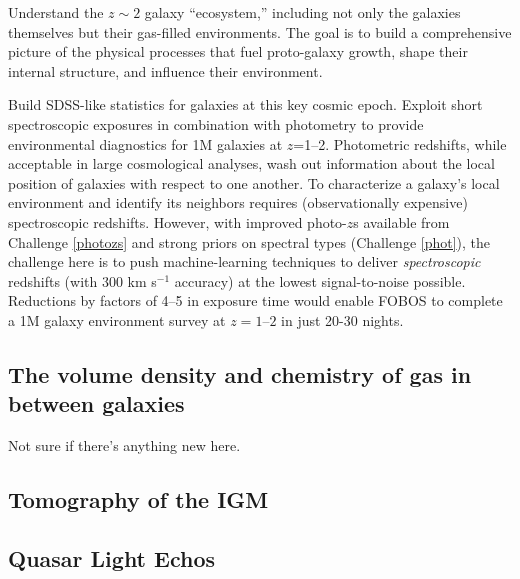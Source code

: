 Understand the $z \sim 2$ galaxy ``ecosystem,'' including not only
the galaxies themselves but their gas-filled environments. The goal
is to build a comprehensive picture of the physical processes that
fuel proto-galaxy growth, shape their internal structure, and
influence their environment.

\noindent{} Build SDSS-like statistics for galaxies at
this key cosmic epoch. Exploit short spectroscopic exposures in
combination with photometry to provide environmental diagnostics for
1M galaxies at $z$=1--2. Photometric redshifts, while acceptable in
large cosmological analyses, wash out information about the local
position of galaxies with respect to one another. To characterize a
galaxy's local environment and identify its neighbors requires
(observationally expensive) spectroscopic redshifts. However, with
improved photo-$z$s available from Challenge \ref{photozs} and strong
priors on spectral types (Challenge \ref{phot}), the challenge here
is to push machine-learning techniques to deliver
\emph{spectroscopic} redshifts (with 300 km s$^{-1}$ accuracy) at the
lowest signal-to-noise possible. Reductions by factors of 4--5 in
exposure time would enable FOBOS to complete a 1M galaxy environment
survey at $z=1$--$2$ in just 20-30 nights.

\noindent{}

\noindent{}

\noindent{}

\subsection{The volume density and chemistry of gas in between galaxies}

Not sure if there's anything new here.

\noindent{}

\noindent{}

\subsection{Tomography of the IGM}

\subsection{Quasar Light Echos} 

